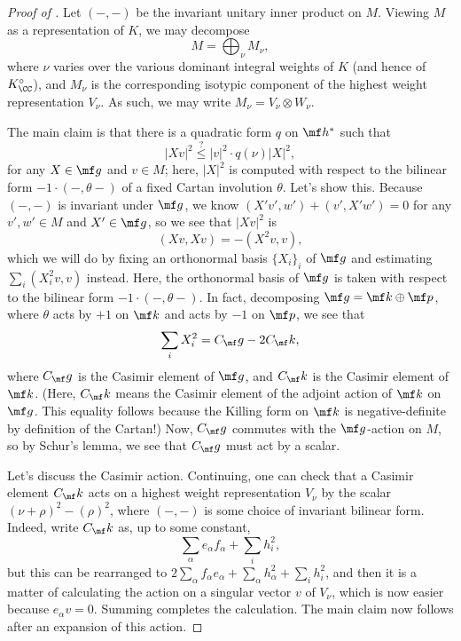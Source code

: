 \documentclass[../notes.tex]{subfiles}
\begin{document}
\begin{proof}[Proof of ]
	Let $(-,-)$ be the invariant unitary inner product on $M$. Viewing $M$ as a representation of $K$, we may decompose
	\[M=\bigoplus_\nu M_\nu,\]
	where $\nu$ varies over the various dominant integral weights of $K$ (and hence of $K_\CC^\circ$), and $M_\nu$ is the corresponding isotypic component of the highest weight representation $V_\nu$. As such, we may write $M_\nu=V_\nu\otimes W_\nu$.

	The main claim is that there is a quadratic form $q$ on $\mf h^*$ such that
	\[\left|Xv\right|^2\stackrel?\le\left|v\right|^2\cdot q(\nu)\left|X\right|^2,\]
	for any $X\in\mf g$ and $v\in M$; here, $\left|X\right|^2$ is computed with respect to the bilinear form $-1\cdot(-,\theta-)$ of a fixed Cartan involution $\theta$. Let's show this. Because $(-,-)$ is invariant under $\mf g$, we know $(X'v',w')+(v',X'w')=0$ for any $v',w'\in M$ and $X'\in\mf g$, so we see that $\left|Xv\right|^2$ is
	\[(Xv,Xv)=-\left(X^2v,v\right),\]
	which we will do by fixing an orthonormal basis $\{X_i\}_i$ of $\mf g$ and estimating $\sum_i\left(X_i^2v,v\right)$ instead. Here, the orthonormal basis of $\mf g$ is taken with respect to the bilinear form $-1\cdot(-,\theta-)$. In fact, decomposing $\mf g=\mf k\oplus\mf p$, where $\theta$ acts by $+1$ on $\mf k$ and acts by $-1$ on $\mf p$, we see that
	\[\sum_iX_i^2=C_\mf g-2C_\mf k,\]
	where $C_\mf g$ is the Casimir element of $\mf g$, and $C_\mf k$ is the Casimir element of $\mf k$. (Here, $C_\mf k$ means the Casimir element of the adjoint action of $\mf k$ on $\mf g$. This equality follows because the Killing form on $\mf k$ is negative-definite by definition of the Cartan!) Now, $C_\mf g$ commutes with the $\mf g$-action on $M$, so by Schur's lemma, we see that $C_\mf g$ must act by a scalar.
	
	Let's discuss the Casimir action. Continuing, one can check that a Casimir element $C_\mf k$ acts on a highest weight representation $V_\nu$ by the scalar $(\nu+\rho)^2-(\rho)^2$, where $(-,-)$ is some choice of invariant bilinear form. Indeed, write $C_\mf k$ as, up to some constant,
	\[\sum_\alpha e_\alpha f_\alpha+\sum_ih_i^2,\]
	but this can be rearranged to $2\sum_\alpha f_\alpha e_\alpha+\sum_\alpha h_\alpha^2+\sum_ih_i^2$, and then it is a matter of calculating the action on a singular vector $v$ of $V_\nu$, which is now easier because $e_\alpha v=0$. Summing completes the calculation. The main claim now follows after an expansion of this action.


\end{proof}
\end{document}
